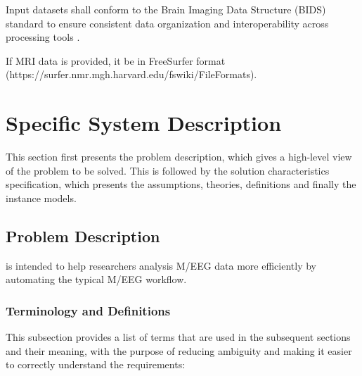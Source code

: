 \documentclass[12pt]{article}
\begin{document}
Input datasets shall conform to the Brain Imaging Data Structure (BIDS) standard to ensure consistent data organization and interoperability across processing tools \citep{gorgolewski_et_al_2016}.

If MRI data is provided, it be in FreeSurfer format (https://surfer.nmr.mgh.harvard.edu/fswiki/FileFormats).








\section{Specific System Description}


This section first presents the problem description, which gives a high-level view of the problem to be solved.  This is followed by the solution characteristics specification, which presents the assumptions, theories, definitions and finally the instance models.




\subsection{Problem Description} \label{Sec_pd}


\progname{} is intended to help researchers analysis M/EEG data more efficiently by automating the typical M/EEG workflow.




\subsubsection{Terminology and Definitions}


This subsection provides a list of terms that are used in the subsequent
sections and their meaning, with the purpose of reducing ambiguity and making it
easier to correctly understand the requirements:
\end{document}
